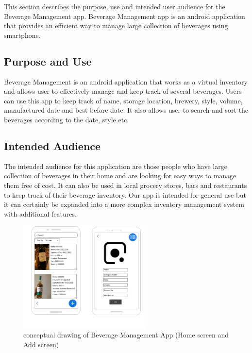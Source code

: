 This section describes the purpose, use and intended user audience for the Beverage Management app. Beverage Management app is an android application that provides an efficient way to manage large collection of beverages using smartphone.

\subsection{Purpose and Use}
Beverage Management is an android application that works as a virtual inventory and allows user to effectively manage and keep track of several beverages. Users can use this app to keep track of name, storage location, brewery, style, volume, manufactured date and best before date. It also allows user to search and sort the beverages according to the date, style etc.

\subsection{Intended Audience}
The intended audience for this application are those people who have large collection of beverages in their home and are looking for easy ways to manage them free of cost. It can also be used in local grocery stores, bars and restaurants to keep track of their beverage inventory. Our app is intended for general use but it can certainly be expanded into a more complex inventory management system with additional features.  

\begin{figure}[h!]
	\centering
   	\includegraphics[width=0.60\textwidth]{images/CD.png}
    \caption{ conceptual drawing of Beverage Management App (Home screen and Add screen) }
\end{figure}
